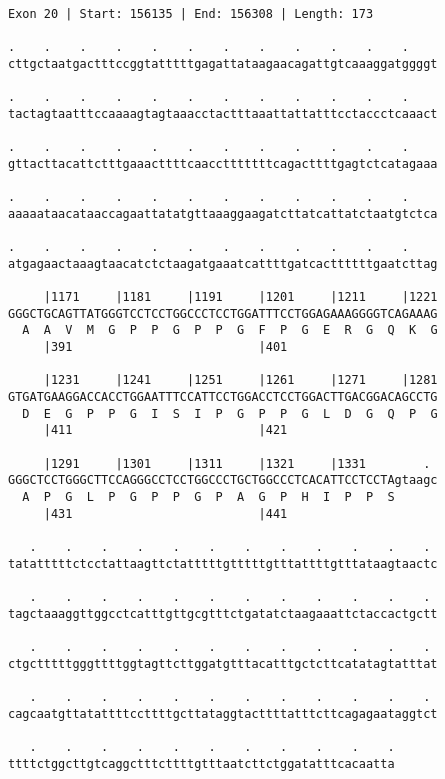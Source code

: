 \documentclass{article}
\begin{document}
\begin{Verbatim}[fontfamily=courier]
Exon 20 | Start: 156135 | End: 156308 | Length: 173

.    .    .    .    .    .    .    .    .    .    .    .    
cttgctaatgactttccggtatttttgagattataagaacagattgtcaaaggatggggt

.    .    .    .    .    .    .    .    .    .    .    .    
tactagtaatttccaaaagtagtaaacctactttaaattattatttcctaccctcaaact

.    .    .    .    .    .    .    .    .    .    .    .    
gttacttacattctttgaaacttttcaacctttttttcagacttttgagtctcatagaaa

.    .    .    .    .    .    .    .    .    .    .    .    
aaaaataacataaccagaattatatgttaaaggaagatcttatcattatctaatgtctca

.    .    .    .    .    .    .    .    .    .    .    .    
atgagaactaaagtaacatctctaagatgaaatcattttgatcacttttttgaatcttag

     |1171     |1181     |1191     |1201     |1211     |1221
GGGCTGCAGTTATGGGTCCTCCTGGCCCTCCTGGATTTCCTGGAGAAAGGGGTCAGAAAG
  A  A  V  M  G  P  P  G  P  P  G  F  P  G  E  R  G  Q  K  G
     |391                          |401                     

     |1231     |1241     |1251     |1261     |1271     |1281
GTGATGAAGGACCACCTGGAATTTCCATTCCTGGACCTCCTGGACTTGACGGACAGCCTG
  D  E  G  P  P  G  I  S  I  P  G  P  P  G  L  D  G  Q  P  G
     |411                          |421                     

     |1291     |1301     |1311     |1321     |1331        . 
GGGCTCCTGGGCTTCCAGGGCCTCCTGGCCCTGCTGGCCCTCACATTCCTCCTAgtaagc
  A  P  G  L  P  G  P  P  G  P  A  G  P  H  I  P  P  S      
     |431                          |441                     

   .    .    .    .    .    .    .    .    .    .    .    . 
tatatttttctcctattaagttctatttttgtttttgtttattttgtttataagtaactc

   .    .    .    .    .    .    .    .    .    .    .    . 
tagctaaaggttggcctcatttgttgcgtttctgatatctaagaaattctaccactgctt

   .    .    .    .    .    .    .    .    .    .    .    . 
ctgctttttgggttttggtagttcttggatgtttacatttgctcttcatatagtatttat

   .    .    .    .    .    .    .    .    .    .    .    . 
cagcaatgttatattttccttttgcttataggtacttttatttcttcagagaataggtct

   .    .    .    .    .    .    .    .    .    .    .
ttttctggcttgtcaggctttcttttgtttaatcttctggatatttcacaatta
\end{Verbatim}
\end{document}
